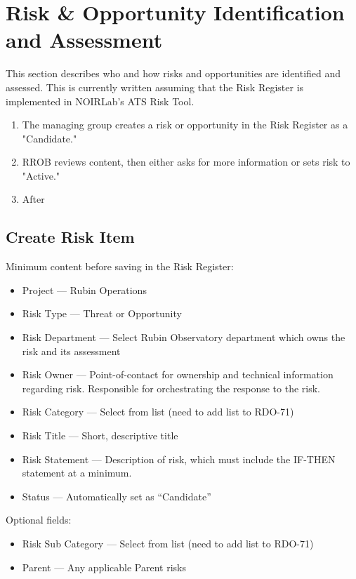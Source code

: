 \section{Risk \& Opportunity Identification and Assessment}
\label{sec:id-assess}

This section describes who and how risks and opportunities are identified and assessed.
This is currently written assuming that the Risk Register is implemented in NOIRLab's ATS Risk Tool.

\begin{enumerate}
	\item The managing group creates a risk or opportunity in the Risk Register as a "Candidate."
	\item RROB reviews content, then either asks for more information or sets risk to "Active."
	\item After
\end{enumerate}

\subsection{Create Risk Item}

Minimum content before saving in the Risk Register:
\begin{itemize}
	\item Project --- Rubin Operations
	\item Risk Type --- Threat or Opportunity
	\item Risk Department --- Select Rubin Observatory department which owns the risk and its assessment
	\item Risk Owner --- Point-of-contact for ownership and technical information regarding risk. Responsible for orchestrating the response to the risk.
	\item Risk Category --- Select from list (need to add list to RDO-71)
	\item Risk Title --- Short, descriptive title
	\item Risk Statement --- Description of risk, which must include the IF-THEN statement at a minimum.
	\item Status --- Automatically set as ``Candidate''
\end{itemize}

Optional fields:
\begin{itemize}
	\item Risk Sub Category --- Select from list (need to add list to RDO-71)
	\item Parent --- Any applicable Parent risks
\end{itemize}



